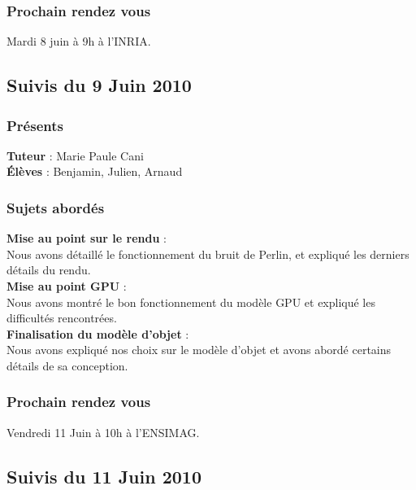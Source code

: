 \documentclass[a4paper,10pt]{article}
\begin{document}
\subsubsection{Prochain rendez vous}
    Mardi 8 juin à 9h à l'INRIA.\\





\subsection{Suivis du  9 Juin 2010}
\subsubsection{Présents}
\textbf{Tuteur} : Marie Paule Cani\\
\textbf{Élèves} : Benjamin, Julien, Arnaud \\

\subsubsection{Sujets abordés}

\textbf{Mise au point sur le rendu} :  \\
Nous avons détaillé le fonctionnement du bruit de Perlin, et expliqué les derniers
détails du rendu.\\

\textbf{Mise au point GPU} :  \\
Nous avons montré le bon fonctionnement du modèle GPU et expliqué les difficultés rencontrées.\\


\textbf{Finalisation du modèle d'objet} :  \\
Nous avons expliqué nos choix sur le modèle d'objet et avons abordé certains détails
de sa conception.\\


\subsubsection{Prochain rendez vous}
    Vendredi 11 Juin à 10h à l'ENSIMAG.\\



\subsection{Suivis du  11 Juin 2010}
\end{document}
